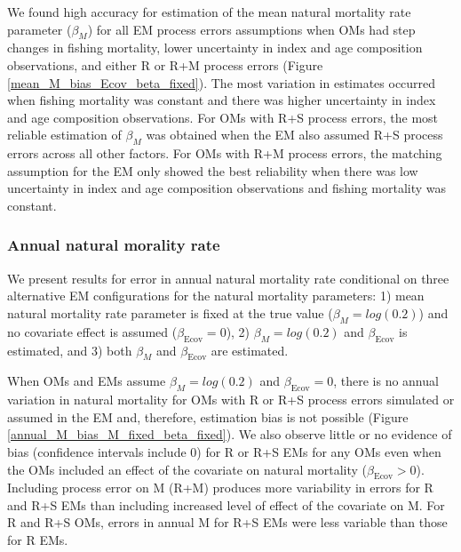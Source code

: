 \documentclass[
  12pt,
]{article}
\begin{document}
We found high accuracy for estimation of the mean natural mortality rate
parameter (\(\beta_M\)) for all EM process errors assumptions when OMs
had step changes in fishing mortality, lower uncertainty in index and
age composition observations, and either R or R+M process errors (Figure
\ref{mean_M_bias_Ecov_beta_fixed}). The most variation in estimates
occurred when fishing mortality was constant and there was higher
uncertainty in index and age composition observations. For OMs with R+S
process errors, the most reliable estimation of \(\beta_M\) was obtained
when the EM also assumed R+S process errors across all other factors.
For OMs with R+M process errors, the matching assumption for the EM only
showed the best reliability when there was low uncertainty in index and
age composition observations and fishing mortality was constant.

\hypertarget{annual-natural-morality-rate}{%
\subsubsection*{Annual natural morality
rate}\label{annual-natural-morality-rate}}

We present results for error in annual natural mortality rate
conditional on three alternative EM configurations for the natural
mortality parameters: 1) mean natural mortality rate parameter is fixed
at the true value (\(\beta_M = log(0.2)\)) and no covariate effect is
assumed (\(\beta_\text{Ecov} = 0\)), 2) \(\beta_M = log(0.2)\) and
\(\beta_\text{Ecov}\) is estimated, and 3) both \(\beta_M\) and
\(\beta_\text{Ecov}\) are estimated.

When OMs and EMs assume \(\beta_M = log(0.2)\) and
\(\beta_\text{Ecov} = 0\), there is no annual variation in natural
mortality for OMs with R or R+S process errors simulated or assumed in
the EM and, therefore, estimation bias is not possible (Figure
\ref{annual_M_bias_M_fixed_beta_fixed}). We also observe little or no
evidence of bias (confidence intervals include 0) for R or R+S EMs for
any OMs even when the OMs included an effect of the covariate on natural
mortality (\(\beta_\text{Ecov} > 0\)). Including process error on M
(R+M) produces more variability in errors for R and R+S EMs than
including increased level of effect of the covariate on M. For R and R+S
OMs, errors in annual M for R+S EMs were less variable than those for R
EMs.
\end{document}
